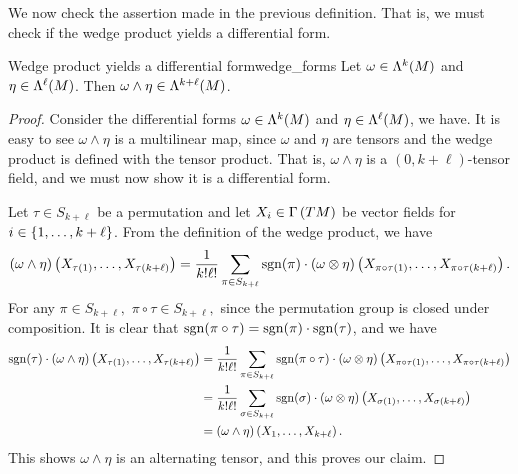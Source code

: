 We now check the assertion made in the previous definition. That is, we must check if the wedge product yields a differential form.
\begin{proposition}{Wedge product yields a differential form}{wedge_forms}
    Let \(\omega \in \forms[k]{M}\) and \(\eta \in \forms[\ell]{M}\). Then \(\omega \wedge \eta \in \forms[k+\ell]{M}\).
\end{proposition}
\begin{proof}
    Consider the differential forms \(\omega \in \forms[k]{M}\) and \(\eta \in \forms[\ell]{M}\), we have. It is easy to see \(\omega \wedge \eta\) is a multilinear map, since \(\omega\) and \(\eta\) are tensors and the wedge product is defined with the tensor product. That is, \(\omega \wedge \eta\) is a \((0, k + \ell)\)-tensor field, and we must now show it is a differential form.

    Let \(\tau \in S_{k+\ell}\) be a permutation and let \(X_i \in \sections{TM}\) be vector fields for \(i \in \set{1, \dots, k+\ell}\). From the definition of the wedge product, we have
    \begin{equation*}
        (\omega \wedge \eta)\left(X_{\tau(1)}, \dots, X_{\tau(k + \ell)}\right) = \frac{1}{k!\ell!} \sum_{\pi \in S_{k+\ell}} \sgn(\pi)\cdot(\omega \otimes \eta)\left(X_{\pi \circ \tau(1)}, \dots, X_{\pi \circ \tau(k+\ell)}\right).
    \end{equation*}
    For any \(\pi \in S_{k+\ell},\) \(\pi \circ \tau \in S_{k+\ell},\) since the permutation group is closed under composition. It is clear that \(\sgn(\pi \circ \tau) = \sgn(\pi) \cdot \sgn(\tau)\), and we have
    \begin{align*}
        \sgn(\tau)\cdot(\omega \wedge \eta)\left(X_{\tau(1)}, \dots, X_{\tau(k+\ell)}\right) &= \frac{1}{k!\ell!} \sum_{\pi \in S_{k+\ell}} \sgn(\pi\circ\tau)\cdot (\omega \otimes\eta)\left(X_{\pi \circ \tau(1)}, \dots, X_{\pi \circ \tau(k+\ell)}\right)\\
                                                                                             &= \frac{1}{k!\ell!}\sum_{\sigma \in S_{k+\ell}} \sgn(\sigma)\cdot(\omega\otimes \eta)\left(X_{\sigma(1)}, \dots, X_{\sigma(k+\ell)}\right)\\
                                                                                             &= (\omega \wedge \eta)\left(X_1, \dots, X_{k+\ell}\right).
    \end{align*}
    This shows \(\omega \wedge \eta\) is an alternating tensor, and this proves our claim.
\end{proof}

